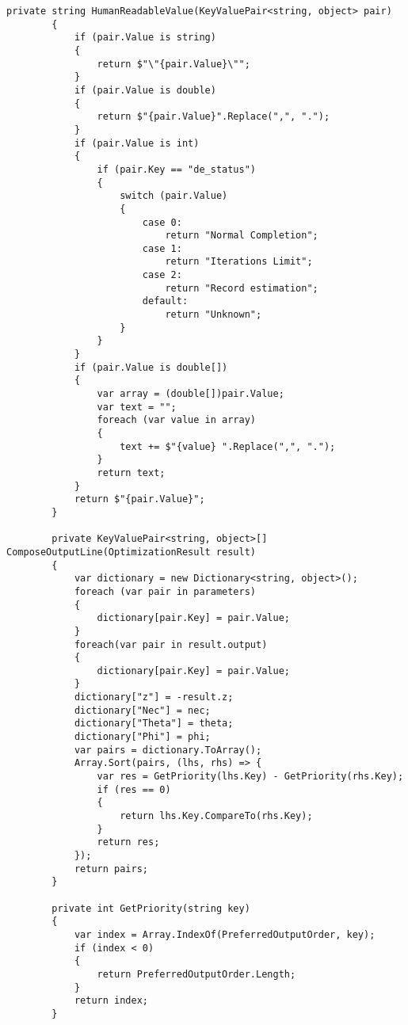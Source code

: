 \documentclass{scrartcl}
\begin{document}
\begin{lstlisting}[language={[Sharp]C}, caption={Experiment}, label={experiment}]
        private string HumanReadableValue(KeyValuePair<string, object> pair)
        {
            if (pair.Value is string)
            {
                return $"\"{pair.Value}\"";
            }
            if (pair.Value is double)
            {
                return $"{pair.Value}".Replace(",", ".");
            }
            if (pair.Value is int)
            {
                if (pair.Key == "de_status")
                {
                    switch (pair.Value)
                    {
                        case 0:
                            return "Normal Completion";
                        case 1:
                            return "Iterations Limit";
                        case 2:
                            return "Record estimation";
                        default:
                            return "Unknown";
                    }
                }
            }
            if (pair.Value is double[])
            {
                var array = (double[])pair.Value;
                var text = "";
                foreach (var value in array)
                {
                    text += $"{value} ".Replace(",", ".");
                }
                return text;
            }
            return $"{pair.Value}";
        }

        private KeyValuePair<string, object>[] ComposeOutputLine(OptimizationResult result)
        {
            var dictionary = new Dictionary<string, object>();
            foreach (var pair in parameters)
            {
                dictionary[pair.Key] = pair.Value;
            }
            foreach(var pair in result.output)
            {
                dictionary[pair.Key] = pair.Value;
            }
            dictionary["z"] = -result.z;
            dictionary["Nec"] = nec;
            dictionary["Theta"] = theta;
            dictionary["Phi"] = phi;
            var pairs = dictionary.ToArray();
            Array.Sort(pairs, (lhs, rhs) => {
                var res = GetPriority(lhs.Key) - GetPriority(rhs.Key);
                if (res == 0)
                {
                    return lhs.Key.CompareTo(rhs.Key);
                }
                return res;
            });
            return pairs;
        }

        private int GetPriority(string key)
        {
            var index = Array.IndexOf(PreferredOutputOrder, key);
            if (index < 0)
            {
                return PreferredOutputOrder.Length;
            }
            return index;
        }


\end{lstlisting}
\end{document}
